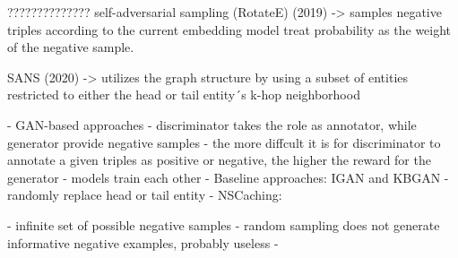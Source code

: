??????????????
    self-adversarial sampling (RotateE) (2019)
        -> samples negative triples according to the current embedding model
        treat probability as the weight of the negative sample.

    SANS (2020)
        -> utilizes the graph structure by using a subset of entities restricted to either the head or tail entity´s k-hop neighborhood






- GAN-based approaches
- discriminator takes the role as annotator, while generator provide negative samples
- the more diffcult it is for discriminator to annotate a given triples as positive or negative, the higher the reward for the generator
- models train each other
- Baseline approaches: IGAN and KBGAN
- randomly replace head or tail entity
- NSCaching: 

- infinite set of possible negative samples
- random sampling does not generate informative negative examples, probably useless
- 